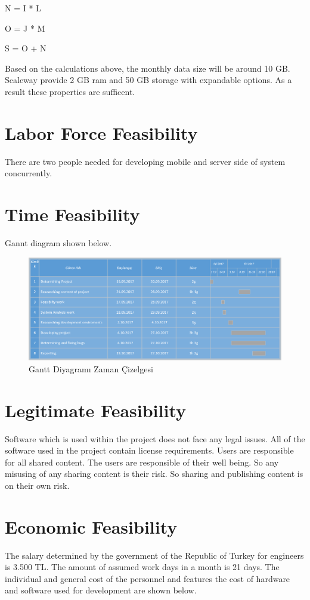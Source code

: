 N = I * L

O = J * M

S = O + N

Based on the calculations above, the monthly data size will be around 10 GB. Scaleway provide 2 GB ram and 50 GB storage with expandable options. As a result these properties are sufficent.

\section{Labor Force Feasibility}
There are two people needed for developing mobile and server side of system concurrently.



\section{Time Feasibility}
Gannt diagram shown below.
\begin{figure}[!htbp]
\centering
\includegraphics[width=\textwidth]{projectChapters/images/gantt.png}
\caption{Gantt Diyagramı Zaman Çizelgesi}
\end{figure}


\section{Legitimate Feasibility}
Software which is used within the project does not face any legal issues. All of the
software used in the project contain license requirements. Users are responsible for
all shared content. The users are responsible of their well being. So any misusing of 
any sharing content is their risk. So sharing and publishing content is on their own risk.


\section{Economic Feasibility}
The salary determined by the government of the Republic of Turkey for engineers
is 3.500 TL\cite{muhendisMaas}. The amount of assumed work days in a month is 21 days. The
individual and general cost of the personnel and features
the cost of hardware and software used for development are shown below.

